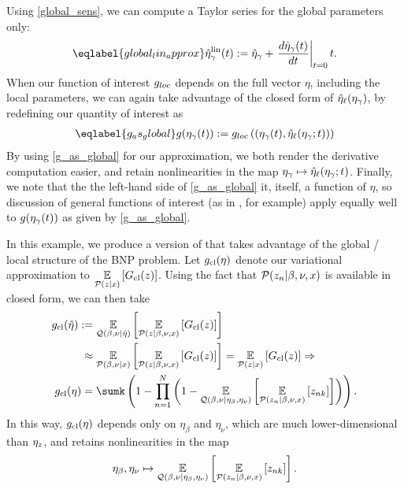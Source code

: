Using \eqref{global_sens}, we can compute a Taylor series for the
global parameters only:
%
\begin{align}\eqlabel{global_lin_approx}
  \etalin_\gamma(\t) := \etaopt_\gamma +
  \fracat{d \etaopt_\gamma(\t)}{d \t}{\t=0} \t .
\end{align}
%
When our function of interest $g_{loc}$ depends on the full vector $\eta$,
including the local parameters, we can again take advantage of the closed form
of $\hat\eta_{\ell}(\eta_{\gamma})$, by redefining our quantity of interest as
%
\begin{align}\eqlabel{g_as_global}
\g(\etaglob(\t)) :=
    \g_{loc}\left(
        \left(\etaglob(\t), \etaoptlocal(\etaglob; \t) \right) \right)
\end{align}
%
By using \eqref{g_as_global} for our approximation, we both render the
derivative computation easier, and retain nonlinearities in the map $\eta_{\gamma}
\mapsto \hat\eta_{\ell}(\eta_{\gamma}; t)$.  Finally, we note that the the left-hand
side of \eqref{g_as_global} it, itself, a function of $\eta$, so discussion of
general functions of interest (as in , for example) apply equally well to $g(\eta_{\gamma}(t))$
as given by \eqref{g_as_global}.


\begin{ex}
%
In this example, we produce a version of 
that takes advantage of the global / local structure of the BNP problem. Let
$g_{\text{cl}}(\eta)$ denote our variational approximation to
$\underset{\mathcal{P}(z\vert x)}{\mathbb{E}}\left[G_{\text{cl}}(z)\right]$.   Using the fact that $\mathcal{P}(z_n
\vert \beta, \nu, x)$ is available in closed form, we can then take
%
\begin{align*}
%
\gclustersabbr(\etaopt) :={}&
    \expect{\q(\beta, \nu \vert\etaopt)}{
        \expect{\p(\z \vert \beta, \nu, \x)}{\nclusters(\z)}
    }
\\\approx{}&
    \expect{\p(\beta, \nu \vert \x)}{
        \expect{\p(\z \vert \beta, \nu, \x)}{\nclusters(\z)}
    }
    = \expect{\p(\z\vert\x)}{\nclusters(\z)} \Rightarrow \\
%
\gclustersabbr(\eta) ={}&
    \sumk \left(1 -  \prod_{\n=1}^\N
        \left(1 - \expect{\q(\beta, \nu \vert \eta_\beta, \eta_\nu)}
                    {\expect{\p(\z_{\n} \vert \beta, \nu, \x)}{\z_{\n\k}}}
                    \right)\right).
%
\end{align*}
%
In this way, $g_{\text{cl}}(\eta)$ depends only on $\eta_\beta$ and $\eta_\nu$,
which are much lower-dimensional than $\eta_z$, and retains nonlinearities in
the map
%
\begin{align*}
%
\eta_\beta, \eta_\nu \mapsto \expect{\q(\beta, \nu \vert \eta_\beta,
\eta_\nu)} {\expect{\p(\z_{\n} \vert \beta, \nu, \x)}{\z_{\n\k}}}.
%
\end{align*}
%
\end{ex}

